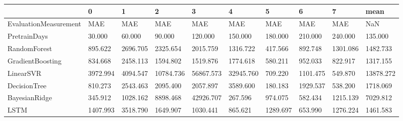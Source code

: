 \begin{tabular}{llllllllll}
\toprule
{} &        0 &        1 &         2 &         3 &         4 &        5 &        6 &        7 &      mean \\
\midrule
EvaluationMeasurement &      MAE &      MAE &       MAE &       MAE &       MAE &      MAE &      MAE &      MAE &       NaN \\
PretrainDays          &   30.000 &   60.000 &    90.000 &   120.000 &   150.000 &  180.000 &  210.000 &  240.000 &   135.000 \\
RandomForest          &  895.622 & 2696.705 &  2325.654 &  2015.759 &  1316.722 &  417.566 &  892.748 & 1301.086 &  1482.733 \\
GradientBoosting      &  834.668 & 2458.113 &  1594.802 &  1519.876 &  1774.618 &  580.211 &  952.033 &  822.917 &  1317.155 \\
LinearSVR             & 3972.994 & 4094.547 & 10784.736 & 56867.573 & 32945.760 &  709.220 & 1101.475 &  549.870 & 13878.272 \\
DecisionTree          &  810.273 & 2543.463 &  2095.400 &  2057.897 &  3589.600 &  180.183 & 1929.537 &  538.200 &  1718.069 \\
BayesianRidge         &  345.912 & 1028.162 &  8898.468 & 42926.707 &   267.596 &  974.075 &  582.434 & 1215.139 &  7029.812 \\
LSTM                  & 1407.993 & 3518.790 &  1649.907 &  1030.441 &   865.621 & 1289.697 &  653.990 & 1276.224 &  1461.583 \\
\bottomrule
\end{tabular}
